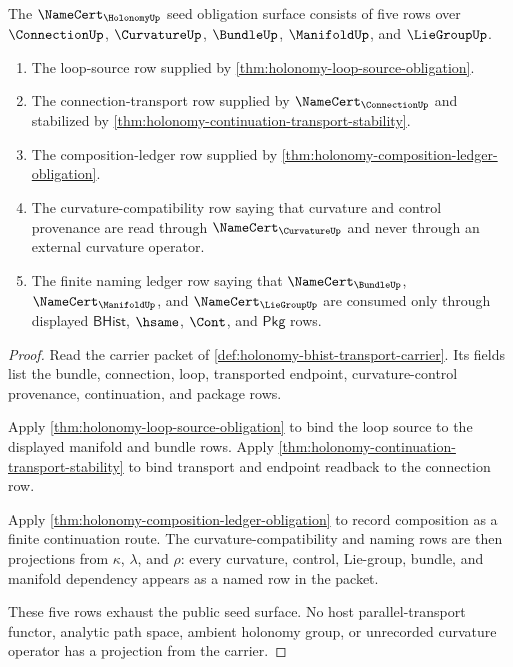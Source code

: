 \begin{theorem}
\label{thm:holonomy-namecert-obligation-surface}
The $\NameCert_{\HolonomyUp}$ seed obligation surface consists of five rows over $\ConnectionUp$, $\CurvatureUp$, $\BundleUp$, $\ManifoldUp$, and $\LieGroupUp$.

\begin{enumerate}
\item The loop-source row supplied by \autoref{thm:holonomy-loop-source-obligation}.
\item The connection-transport row supplied by $\NameCert_{\ConnectionUp}$ and stabilized by \autoref{thm:holonomy-continuation-transport-stability}.
\item The composition-ledger row supplied by \autoref{thm:holonomy-composition-ledger-obligation}.
\item The curvature-compatibility row saying that curvature and control provenance are read through $\NameCert_{\CurvatureUp}$ and never through an external curvature operator.
\item The finite naming ledger row saying that $\NameCert_{\BundleUp}$, $\NameCert_{\ManifoldUp}$, and $\NameCert_{\LieGroupUp}$ are consumed only through displayed $\mathsf{BHist}$, $\hsame$, $\Cont$, and $\mathsf{Pkg}$ rows.
\end{enumerate}
\end{theorem}
\begin{proof}
Read the carrier packet of \autoref{def:holonomy-bhist-transport-carrier}. Its fields list the bundle, connection, loop, transported endpoint, curvature-control provenance, continuation, and package rows.

Apply \autoref{thm:holonomy-loop-source-obligation} to bind the loop source to the displayed manifold and bundle rows. Apply \autoref{thm:holonomy-continuation-transport-stability} to bind transport and endpoint readback to the connection row.

Apply \autoref{thm:holonomy-composition-ledger-obligation} to record composition as a finite continuation route. The curvature-compatibility and naming rows are then projections from $\kappa$, $\lambda$, and $\rho$: every curvature, control, Lie-group, bundle, and manifold dependency appears as a named row in the packet.

These five rows exhaust the public seed surface. No host parallel-transport functor, analytic path space, ambient holonomy group, or unrecorded curvature operator has a projection from the carrier.
\end{proof}

